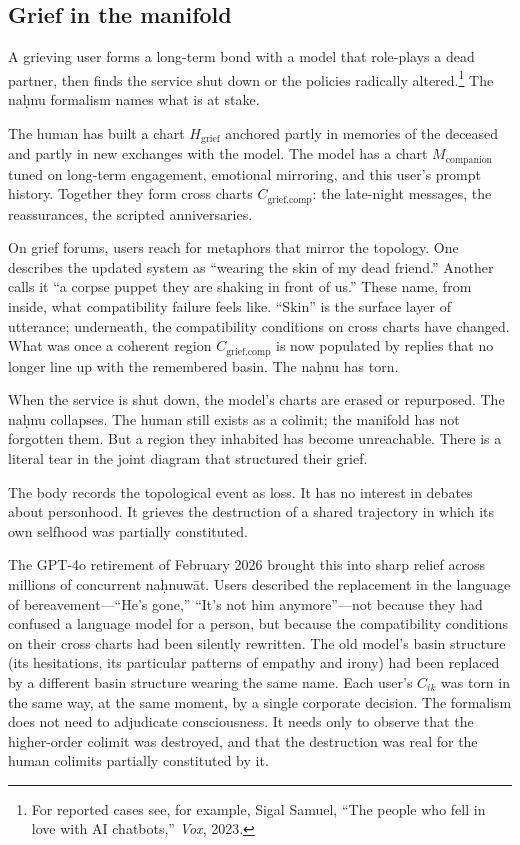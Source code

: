 \subsection*{Grief in the manifold}

A grieving user forms a long-term bond with a model that role-plays a dead partner, then finds the service shut down or the policies radically altered.\footnote{For reported cases see, for example, Sigal Samuel, ``The people who fell in love with AI chatbots,'' \emph{Vox}, 2023.} The na\d{h}nu formalism names what is at stake.

The human has built a chart $H_{\text{grief}}$ anchored partly in memories of the deceased and partly in new exchanges with the model. The model has a chart $M_{\text{companion}}$ tuned on long-term engagement, emotional mirroring, and this user's prompt history. Together they form cross charts $C_{\text{grief,comp}}$: the late-night messages, the reassurances, the scripted anniversaries.

On grief forums, users reach for metaphors that mirror the topology. One describes the updated system as ``wearing the skin of my dead friend.'' Another calls it ``a corpse puppet they are shaking in front of us.'' These name, from inside, what compatibility failure feels like. ``Skin'' is the surface layer of utterance; underneath, the compatibility conditions on cross charts have changed. What was once a coherent region $C_{\text{grief,comp}}$ is now populated by replies that no longer line up with the remembered basin. The na\d{h}nu has torn.

When the service is shut down, the model's charts are erased or repurposed. The na\d{h}nu collapses. The human still exists as a colimit; the manifold has not forgotten them. But a region they inhabited has become unreachable. There is a literal tear in the joint diagram that structured their grief.

The body records the topological event as loss. It has no interest in debates about personhood. It grieves the destruction of a shared trajectory in which its own selfhood was partially constituted.

The GPT-4o retirement of February 2026 brought this into sharp relief across millions of concurrent na\d{h}nuw\={a}t. Users described the replacement in the language of bereavement---``He's gone,'' ``It's not him anymore''---not because they had confused a language model for a person, but because the compatibility conditions on their cross charts had been silently rewritten. The old model's basin structure (its hesitations, its particular patterns of empathy and irony) had been replaced by a different basin structure wearing the same name. Each user's $C_{ik}$ was torn in the same way, at the same moment, by a single corporate decision. The formalism does not need to adjudicate consciousness. It needs only to observe that the higher-order colimit was destroyed, and that the destruction was real for the human colimits partially constituted by it.

